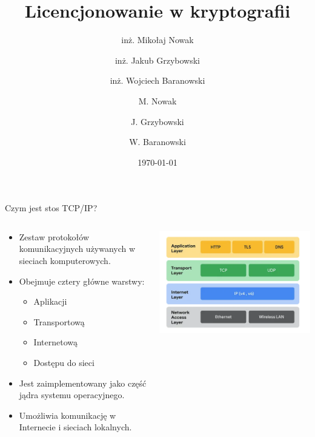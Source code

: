 \documentclass[aspectratio=169]{beamer}
\title[PG Presentation]{Licencjonowanie w kryptografii}
\author{inż. Mikołaj Nowak \and inż. Jakub Grzybowski \and inż. Wojciech Baranowski}
\date{\today}
\begin{document}
\pgtitleframe


\author{M. Nowak \and J. Grzybowski \and W. Baranowski}

\begin{frame}{Czym jest stos TCP/IP?}
  \begin{columns}
    \begin{column}{0.55\textwidth}
      \begin{itemize}
        \item Zestaw protokołów komunikacyjnych używanych w sieciach komputerowych.
        \item Obejmuje cztery główne warstwy:
        \begin{itemize}
          \item Aplikacji
          \item Transportową
          \item Internetową
          \item Dostępu do sieci
        \end{itemize}
        \item Jest zaimplementowany jako część jądra systemu operacyjnego.
        \item Umożliwia komunikację w Internecie i sieciach lokalnych.
      \end{itemize}
    \end{column}
    \begin{column}{0.4\textwidth}
      \centering
      \includegraphics[width=\linewidth]{tcpip.png}
    \end{column}
  \end{columns}
\end{frame}
\end{document}
